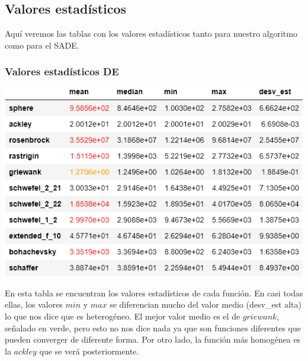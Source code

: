 \documentclass[11pt, a4paper, titlepage]{article}
\begin{document}
\subsection{Valores estadísticos}
Aquí veremos las tablas con los valores estadísticos tanto para nuestro algoritmo como para el SADE.
\subsubsection{Valores estadísticos DE}
\vspace{5mm}
\begin{center}
\includegraphics[width=\textwidth]{tableDE.png}
\end{center}
En esta tabla se encuentran los valores estadísticos de cada función. En casi todas ellas, los valores $min$ y $max$  se diferencian mucho del valor medio (desv\_est alta) lo que nos dice que es heterogéneo. El mejor valor medio es el de $griewank$, señalado en verde, pero esto no nos dice nada ya que son funciones diferentes que pueden converger de diferente forma. Por otro lado, la función más homogénea es la $ackley$ que se verá posteriormente.
\end{document}
